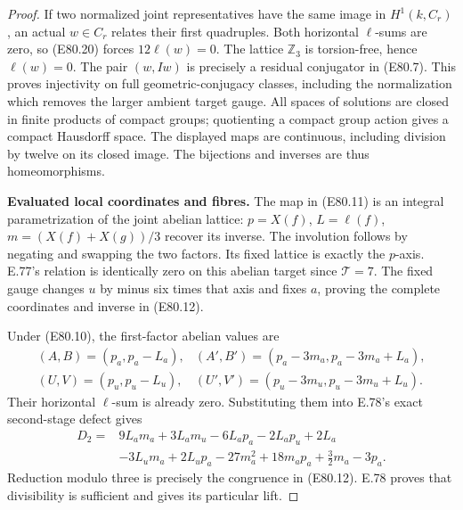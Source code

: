 \begin{proof}
If two normalized joint representatives have the
same image in $H^1(k,C_r)$, an actual $w\in C_r$
relates their first quadruples. Both horizontal
$\ell$-sums are zero, so (E80.20) forces
$12\ell(w)=0$. The lattice $\mathbb Z_3$ is
torsion-free, hence $\ell(w)=0$. The pair $(w,Iw)$
is precisely a residual conjugator in (E80.7).
This proves injectivity on full geometric-conjugacy
classes, including the normalization which removes
the larger ambient target gauge. All spaces of
solutions are closed in finite products of compact
groups; quotienting a compact group action gives
a compact Hausdorff space. The displayed maps are
continuous, including division by twelve on its
closed image. The bijections and inverses are thus
homeomorphisms.

\textbf{Evaluated local coordinates and fibres.}
The map in (E80.11) is an integral parametrization
of the joint abelian lattice: $p=X(f)$,
$L=\ell(f)$, $m=(X(f)+X(g))/3$ recover its inverse.
The involution follows by negating and swapping
the two factors. Its fixed lattice is exactly the
$p$-axis. E.77's relation is identically zero on
this abelian target since $\mathcal T=7$.
The fixed gauge changes $u$ by minus six times
that axis and fixes $a$, proving the complete
coordinates and inverse in (E80.12).

Under (E80.10), the first-factor abelian values are
\[
 \begin{array}{ll}
 (A,B)=(p_a,p_a-L_a),&
 (A',B')=(p_a-3m_a,p_a-3m_a+L_a),\\
 (U,V)=(p_u,p_u-L_u),&
 (U',V')=(p_u-3m_u,p_u-3m_u+L_u).
 \end{array}
 \tag{E80.21}
\]
Their horizontal $\ell$-sum is already zero.
Substituting them into E.78's exact second-stage
defect gives
\[
 \begin{aligned}
 D_2={}&9L_am_a+3L_am_u-6L_ap_a-2L_ap_u+2L_a\\
       &-3L_um_a+2L_up_a-27m_a^2+18m_ap_a
                      +\tfrac32m_a-3p_a.
 \end{aligned}
 \tag{E80.22}
\]
Reduction modulo three is precisely the congruence
in (E80.12). E.78 proves that divisibility is
sufficient and gives its particular lift.


\end{proof}
